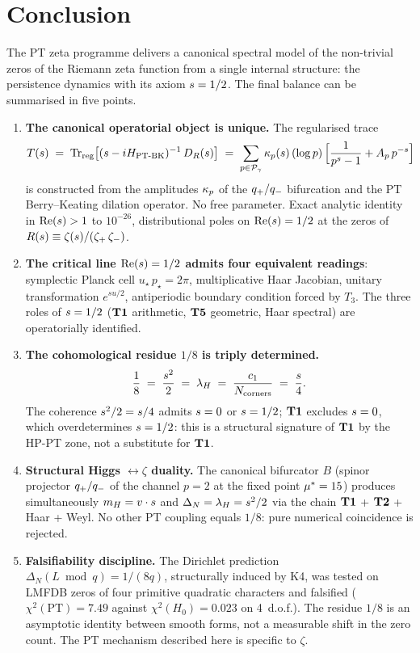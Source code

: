 \section{Conclusion}
\label{sec:conclusion}

The PT zeta programme delivers a canonical spectral model of the
non-trivial zeros of the Riemann zeta function from a single internal
structure: the persistence dynamics with its axiom $s = 1/2$.
The final balance can be summarised in five points.

\begin{enumerate}[leftmargin=*]
\item \textbf{The canonical operatorial object is unique.} The
regularised trace
\[
T(s) \;=\; \operatorname{Tr}_{\mathrm{reg}}\!\big[(s - iH_{\mathrm{PT\text{-}BK}})^{-1}\,D_R(s)\big]
\;=\; \sum_{p \in \mathcal{P}_\gamma} \kappa_p(s)\,(\log p)\,\Big[\frac{1}{p^s - 1} + A_p\,p^{-s}\Big]
\]
is constructed from the amplitudes $\kappa_p$ of the
$q_{+}/q_{-}$ bifurcation and the PT Berry--Keating dilation
operator. No free parameter. Exact analytic identity in
$\operatorname{Re}(s) > 1$ to $10^{-26}$, distributional poles on
$\operatorname{Re}(s) = 1/2$ at the zeros of
$R(s) \equiv \zeta(s) / (\zeta_{+}\,\zeta_{-})$.

\item \textbf{The critical line $\operatorname{Re}(s) = 1/2$ admits four
equivalent readings}: symplectic Planck cell
$u_\star\,p_\star = 2\pi$, multiplicative Haar Jacobian, unitary
transformation $e^{su/2}$, antiperiodic boundary condition forced
by $T_3$. The three roles of $s = 1/2$ ($\textbf{T1}$ arithmetic,
$\textbf{T5}$ geometric, Haar spectral) are operatorially identified.

\item \textbf{The cohomological residue $1/8$ is triply determined.}
\[
\dfrac{1}{8} \;=\; \dfrac{s^{2}}{2} \;=\; \lambda_H
\;=\; \dfrac{c_1}{N_{\mathrm{corners}}} \;=\; \dfrac{s}{4}.
\]
The coherence $s^{2}/2 = s/4$ admits $s = 0$ or
$s = 1/2$; $\textbf{T1}$ excludes $s = 0$, which overdetermines
$s = 1/2$: this is a structural signature of $\textbf{T1}$ by the
HP-PT zone, not a substitute for $\textbf{T1}$.

\item \textbf{Structural Higgs $\leftrightarrow \zeta$ duality.}
The canonical bifurcator $B$ (spinor projector $q_{+}/q_{-}$ of
the channel $p = 2$ at the fixed point $\mu^{*} = 15$) produces
simultaneously $m_H = v \cdot s$ and
$\Delta_N = \lambda_H = s^{2}/2$ via the chain
$\textbf{T1}$ + $\textbf{T2}$ + Haar + Weyl. No other PT coupling equals
$1/8$: pure numerical coincidence is rejected.

\item \textbf{Falsifiability discipline.} The Dirichlet prediction
$\Delta_N(L \bmod q) = 1/(8q)$, structurally induced by K4, was
tested on LMFDB zeros of four primitive quadratic characters and
falsified ($\chi^{2}(\mathrm{PT}) = 7.49$ against
$\chi^{2}(H_0) = 0.023$ on 4~d.o.f.). The residue $1/8$ is an
asymptotic identity between smooth forms, not a measurable shift in
the zero count. The PT mechanism described here is specific to
$\zeta$.
\end{enumerate}

